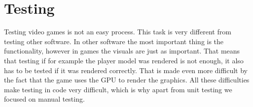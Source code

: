 \chapter{Testing} \label{sec:testing}
Testing video games is not an easy process.
This task is very different from testing other software.
In other software the most important thing is the functionality, however in games the visuals are just as important.
That means that testing if for example the player model was rendered is not enough, it also has to be tested if it was rendered correctly.
That is made even more difficult by the fact that the game uses the GPU to render the graphics.
All these difficulties make testing in code very difficult, which is why apart from unit testing we focused on manual testing.


